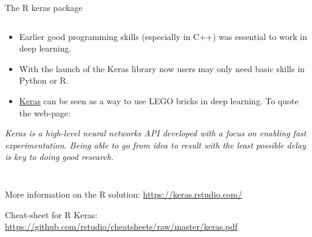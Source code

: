 \documentclass[10pt,ignorenonframetext,]{beamer}
\providecommand{\tightlist}{%
  \setlength{\itemsep}{0pt}\setlength{\parskip}{0pt}}
\begin{document}
\begin{frame}

\begin{block}{The R keras package}

\(~\)

\begin{itemize}
\tightlist
\item
  Earlier good programming skills (especially in C++) was essential to
  work in deep learning.
\end{itemize}

\vspace{2mm}

\begin{itemize}
\tightlist
\item
  With the launch of the Keras library now users may only need basic
  skills in Python or R.
\end{itemize}

\vspace{2mm}

\begin{itemize}
\tightlist
\item
  \href{https://keras.io/}{Keras} can be seen as a way to use LEGO
  bricks in deep learning. To quote the web-page:
\end{itemize}

\vspace{4mm}

\emph{Keras is a high-level neural networks API developed with a focus
on enabling fast experimentation. Being able to go from idea to result
with the least possible delay is key to doing good research.}

\(~\)

\(~\)

\scriptsize

More information on the R solution: \url{https://keras.rstudio.com/}

\vspace{1mm}

Cheat-sheet for R Keras:
\url{https://github.com/rstudio/cheatsheets/raw/master/keras.pdf}

\end{block}

\end{frame}
\end{document}
